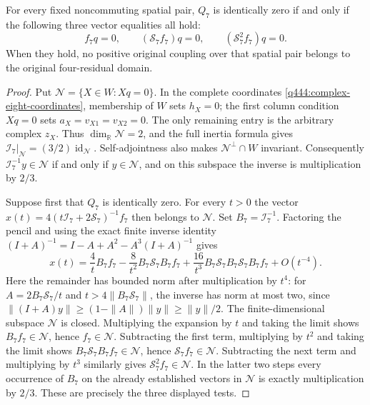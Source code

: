\begin{proposition}
\label{q444:finite-coupling-domain-test}
For every fixed noncommuting spatial pair, $Q_7$ is identically zero if
and only if the following three vector equalities all hold:
\begin{equation}
 f_7q=0,\qquad (\mathcal S_7f_7)q=0,\qquad
                 (\mathcal S_7^2f_7)q=0.
 \label{q444:finite-coupling-three-tests}
\end{equation}
When they hold, no positive original coupling over that spatial pair
belongs to the original four-residual domain.
\end{proposition}
\begin{proof}
Put $\mathcal N=\{X\in W:Xq=0\}$. In the complete coordinates
\eqref{q444:complex-eight-coordinates}, membership of $W$ sets $h_X=0$;
the first column condition $Xq=0$ sets $a_X=v_{X1}=v_{X2}=0$.
The only remaining entry is the arbitrary complex $z_X$. Thus
$\dim_{\mathbb R}\mathcal N=2$, and the full inertia formula gives
$\mathcal I_7|_{\mathcal N}=(3/2)\operatorname{id}_{\mathcal N}$.
Self-adjointness also makes $\mathcal N^\perp\cap W$ invariant.
Consequently $\mathcal I_7^{-1}y\in\mathcal N$ if and only if
$y\in\mathcal N$, and on this subspace the inverse is multiplication
by $2/3$.

Suppose first that $Q_7$ is identically zero. For every $t>0$ the vector
$x(t)=4(t\mathcal I_7+2\mathcal S_7)^{-1}f_7$ then belongs to
$\mathcal N$. Set $B_7=\mathcal I_7^{-1}$.
Factoring the pencil and using the exact finite inverse identity
$(I+A)^{-1}=I-A+A^2-A^3(I+A)^{-1}$ gives
\[
 x(t)=\frac4tB_7f_7-\frac8{t^2}B_7\mathcal S_7B_7f_7
       +\frac{16}{t^3}B_7\mathcal S_7B_7\mathcal S_7B_7f_7
       +O(t^{-4}).
\]
Here the remainder has bounded norm after multiplication by $t^4$:
for $A=2B_7\mathcal S_7/t$ and $t>4\|B_7\mathcal S_7\|$, the inverse
has norm at most two, since
$\|(I+A)y\|\ge(1-\|A\|)\|y\|\ge\|y\|/2$.
The finite-dimensional subspace $\mathcal N$ is closed. Multiplying the
expansion by $t$ and taking the limit shows $B_7f_7\in\mathcal N$, hence
$f_7\in\mathcal N$. Subtracting the first term, multiplying by $t^2$
and taking the limit shows $B_7\mathcal S_7B_7f_7\in\mathcal N$,
hence $\mathcal S_7f_7\in\mathcal N$. Subtracting the next term and
multiplying by $t^3$ similarly gives
$\mathcal S_7^2f_7\in\mathcal N$. In the latter two steps every occurrence
of $B_7$ on the already established vectors in $\mathcal N$ is exactly
multiplication by $2/3$. These are precisely the three displayed tests.


\end{proof}
